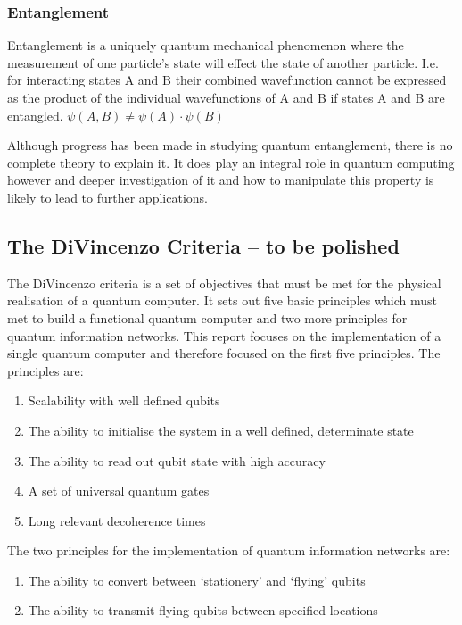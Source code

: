 \subsubsection{Entanglement}
Entanglement is a uniquely quantum mechanical phenomenon where the measurement of one particle's state will effect the state of another particle.
I.e. for interacting states A and B their combined wavefunction cannot be expressed as the product of the individual wavefunctions of A and B if states A and B are entangled. \cite{bransden_quantum_2000}
$\psi(A,B)\neq \psi(A)\cdot \psi(B)$ 

Although progress has been made in studying quantum entanglement, there is no complete theory to explain it. 
It does play an integral role in quantum computing however and deeper investigation of it and how to manipulate this property is likely to lead to further applications. \cite{nielsen_quantum_2010}


\subsection{The DiVincenzo Criteria -- to be polished}
The DiVincenzo criteria is a set of objectives that must be met for the physical realisation of a quantum computer. 
It sets out five basic principles which must met to build a functional quantum computer and two more principles for quantum information networks. \cite{bergou_quantum_2021}
This report focuses on the implementation of a single quantum computer and therefore focused on the first five principles.
The principles are:
\begin{enumerate}
    \item Scalability with well defined qubits
    \item The ability to initialise the system in a well defined, determinate state
    \item The ability to read out qubit state with high accuracy
    \item A set of universal quantum gates
    \item Long relevant decoherence times
    \setcounter{enumTemp}{\theenumi}
\end{enumerate}
The two principles for the implementation of quantum information networks are:
\begin{enumerate}
    \setcounter{enumi}{\theenumTemp}
    \item The ability to convert between `stationery' and `flying' qubits
    \item The ability to transmit flying qubits between specified locations
\end{enumerate}

